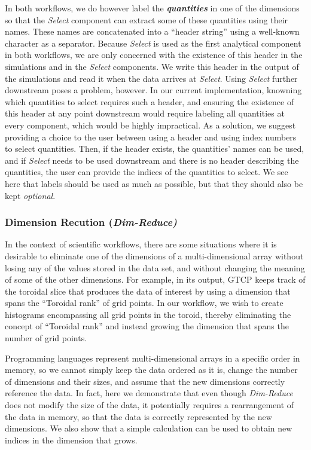 \documentclass[conference]{IEEEtran}
\begin{document}
In both workflows, we do however label the \textbf{\em quantities} in one of
the dimensions so that the {\em Select} component can extract some of these
quantities using their names. These names are concatenated into a ``header
string'' using a well-known character as a separator. Because {\em Select} is
used as the first analytical component in both workflows, we are only concerned
with the existence of this header in the simulations and in the {\em Select}
components. We write this header in the output of the simulations and read it
when the data arrives at {\em Select}.  Using {\em Select} further downstream
poses a problem, however. In our current implementation, knowning which
quantities to select requires such a header, and ensuring the existence of this
header at any point downstream would require labeling all quantities at every
component, which would be highly impractical.  As a solution, we suggest
providing a choice to the user between using a header and using index numbers
to select quantities. Then, if the header exists, the quantities' names can be
used, and if {\em Select} needs to be used downstream and there is no header
describing the quantities, the user can provide the indices of the quantities
to select. We see here that labels should be used as much as possible, but that
they should also be kept {\em optional}.

\subsubsection{Dimension Recution (\em Dim-Reduce)}

In the context of scientific workflows, there are some situations where it is
desirable to eliminate one of the dimensions of a multi-dimensional array
without losing any of the values stored in the data set, and without changing
the meaning of some of the other dimensions. For example, in its output, GTCP
keeps track of the toroidal slice that produces the data of interest by using a
dimension that spans the ``Toroidal rank'' of grid points. In our workflow, we
wish to create histograms encompassing all grid points in the toroid, thereby
eliminating the concept of ``Toroidal rank'' and instead growing the dimension
that spans the number of grid points.

Programming languages represent multi-dimensional arrays in a specific order in
memory, so we cannot simply keep the data ordered as it is, change the number
of dimensions and their sizes, and assume that the new dimensions correctly
reference the data. In fact, here we demonstrate that even though {\em
Dim-Reduce} does not modify the size of the data, it potentially requires a
rearrangement of the data in memory, so that the data is correctly represented
by the new dimensions. We also show that a simple calculation can be used to
obtain new indices in the dimension that grows.
\end{document}
